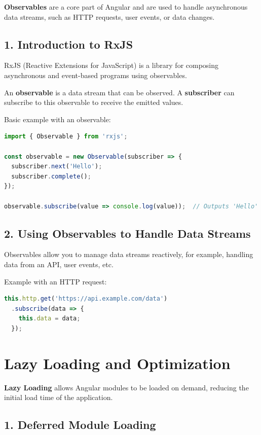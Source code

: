 \documentclass{article}
\begin{document}
\textbf{Observables} are a core part of Angular and are used to handle asynchronous data streams, such as HTTP requests, user events, or data changes.

\subsection*{1. Introduction to RxJS}

RxJS (Reactive Extensions for JavaScript) is a library for composing asynchronous and event-based programs using observables.

An \textbf{observable} is a data stream that can be observed. A \textbf{subscriber} can subscribe to this observable to receive the emitted values.

Basic example with an observable:
\begin{lstlisting}[language=TypeScript, caption={Basic Observable Example}, label={lst:rxjs-basic-observable}]
import { Observable } from 'rxjs';

const observable = new Observable(subscriber => {
  subscriber.next('Hello');
  subscriber.complete();
});

observable.subscribe(value => console.log(value));  // Outputs 'Hello'
\end{lstlisting}

\subsection*{2. Using Observables to Handle Data Streams}

Observables allow you to manage data streams reactively, for example, handling data from an API, user events, etc.

Example with an HTTP request:
\begin{lstlisting}[language=TypeScript, caption={Using Observables for HTTP Requests}, label={lst:rxjs-http-observable}]
this.http.get('https://api.example.com/data')
  .subscribe(data => {
    this.data = data;
  });
\end{lstlisting}

\section*{Lazy Loading and Optimization}

\textbf{Lazy Loading} allows Angular modules to be loaded on demand, reducing the initial load time of the application.

\subsection*{1. Deferred Module Loading}
\end{document}
